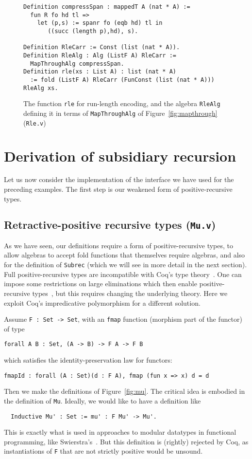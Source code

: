 \documentclass[a4paper,USenglish]{lipics-v2021}
\begin{document}
\begin{figure}
\begin{verbatim}
Definition compressSpan : mappedT A (nat * A) :=
  fun R fo hd tl => 
    let (p,s) := spanr fo (eqb hd) tl in
       ((succ (length p),hd), s).

Definition RleCarr := Const (list (nat * A)).
Definition RleAlg : Alg (ListF A) RleCarr :=
  MapThroughAlg compressSpan.
Definition rle(xs : List A) : list (nat * A)
  := fold (ListF A) RleCarr (FunConst (list (nat * A))) RleAlg xs.
\end{verbatim}
\caption{The function \texttt{rle} for run-length encoding, and the algebra \texttt{RleAlg} defining it
in terms of \texttt{MapThroughAlg} of Figure~\ref{fig:mapthrough} (\texttt{Rle.v})}
\label{fig:rle}
\end{figure}

\section{Derivation of subsidiary recursion}
\label{sec:deriv}

Let us now consider the implementation of the
interface we have used for the preceding examples.
The first step is our weakened form of positive-recursive
types.

\subsection{Retractive-positive recursive types (\texttt{Mu.v})}
\label{sec:mu}

As we have seen, our definitions require a form of positive-recursive
types, to allow algebras to accept fold functions that themselves
require algebras, and also for the definition of \verb|Subrec| (which
we will see in more detail in the next section).  Full
positive-recursive types are incompatible with Coq's type
theory~\cite{coquand88}.  One can impose some restrictions on large
eliminations which then enable positive-recursive
types~\cite{blanqui05}, but this requires changing the underlying
theory.  Here we exploit Coq's
impredicative polymorphism for a different solution.

Assume \verb|F : Set -> Set|, with an \verb|fmap| function
(morphism part of the functor) of type
\begin{verbatim}
forall A B : Set, (A -> B) -> F A -> F B
\end{verbatim}
\noindent which satisfies the identity-preservation law for functors:
\begin{verbatim}
fmapId : forall (A : Set)(d : F A), fmap (fun x => x) d = d
\end{verbatim}
\noindent Then we make the definitions of Figure~\ref{fig:mu}.  The critical
idea is embodied in the definition of \verb|Mu|.  Ideally, we would like
to have a definition like
\begin{verbatim}
  Inductive Mu' : Set := mu' : F Mu' -> Mu'.
\end{verbatim}
\noindent This is exactly what is used in approaches to modular
datatypes in functional programming, like
Swierstra's~\cite{swierstra08}.  But this definition is (rightly)
rejected by Coq, as instantiations of
\verb|F| that are not strictly positive would be unsound.
\end{document}

